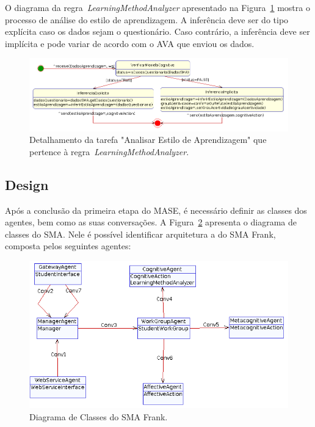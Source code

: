 O diagrama da regra~\emph{LearningMethodAnalyzer} apresentado na Figura~\ref{fig:td-analise-aprendizagem} mostra o processo de análise do estilo de aprendizagem. A inferência deve ser do tipo explícita caso os dados sejam o questionário. Caso contrário, a inferência deve ser implícita e pode variar de acordo com o AVA que enviou os dados.
\begin{figure}
	\centering
	\includegraphics[scale=0.48]{images/td-analise-aprendizagem.png}
	\caption{Detalhamento da tarefa "Analisar Estilo de Aprendizagem" que pertence à regra~\emph{LearningMethodAnalyzer}.}
	\label{fig:td-analise-aprendizagem}
\end{figure}

\subsection{Design}\label{subsection:design}

Após a conclusão da primeira etapa do MASE, é necessário definir as classes dos agentes, bem como as suas conversações. A Figura~\ref{fig:agent-class-diagram} apresenta o diagrama de classes do SMA. Nele é possível identificar arquitetura a do SMA Frank, composta pelos seguintes agentes:

\begin{figure}
	\centering
	\includegraphics[scale=0.48]{images/agent-class-diagram.png}
	\caption{Diagrama de Classes do SMA Frank.}
	\label{fig:agent-class-diagram}
\end{figure}

